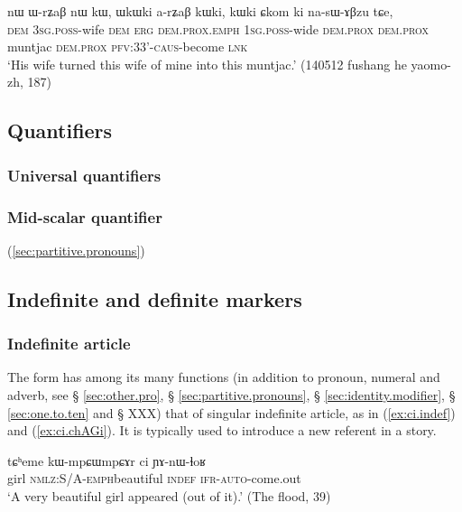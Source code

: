 \begin{exe}
\ex \label{ex:WkWki.arZaB.kWki}
 \gll   nɯ ɯ-rʑaβ nɯ kɯ, ɯkɯki a-rʑaβ kɯki, kɯki ɕkom ki na-sɯ-ɤβzu tɕe, \\
 \textsc{dem} \textsc{3sg}.\textsc{poss}-wife \textsc{dem} \textsc{erg} \textsc{dem}.\textsc{prox}.\textsc{emph} \textsc{1sg}.\textsc{poss}-wide \textsc{dem}.\textsc{prox} \textsc{dem}.\textsc{prox} muntjac \textsc{dem}.\textsc{prox}  \textsc{pfv}:3\fl{}3'-\textsc{caus}-become \textsc{lnk} \\
\glt `His wife turned this wife of mine into this muntjac.' (140512 fushang he yaomo-zh, 187)
\end{exe}

\subsection{Quantifiers} \label{sec:quantifiers.determiners}
\subsubsection{Universal quantifiers} \label{sec:universal.quant}
\subsubsection{Mid-scalar quantifier} \label{sec:tsuku}
(\ref{sec:partitive.pronouns})

\subsection{Indefinite and definite markers} \label{sec:indefinite.markers}

\subsubsection{Indefinite article} \label{sec:indef.article}
The form  has among its many functions (in addition to pronoun, numeral and adverb, see § \ref{sec:other.pro}, § \ref{sec:partitive.pronouns}, § \ref{sec:identity.modifier}, § \ref{sec:one.to.ten} and § XXX) that of singular indefinite article, as in (\ref{ex:ci.indef}) and (\ref{ex:ci.chAGi}). It is typically used to introduce a new referent in a story.

\begin{exe}
\ex \label{ex:ci.indef}
\gll tɕʰeme kɯ-mpɕɯ\redp{}mpɕɤr ci ɲɤ-nɯ-ɬoʁ \\
girl \textsc{nmlz}:S/A-\textsc{emph}\redp{}beautiful \textsc{indef} \textsc{ifr}-\textsc{auto}-come.out \\
\glt `A very beautiful girl appeared (out of it).' (The flood, 39)
\end{exe}

